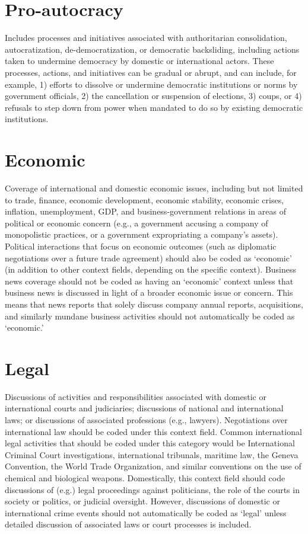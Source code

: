 \documentclass[11pt]{report}
\begin{document}
\section{Pro-autocracy}\label{context:pro-autocracy}

Includes processes and initiatives associated with authoritarian consolidation, autocratization, de-democratization, or democratic backsliding, including actions taken to undermine democracy by domestic or international actors. These processes, actions, and initiatives can be gradual or abrupt, and can include, for example, 1) efforts to dissolve or undermine democratic institutions or norms by government officials, 2) the cancellation or suspension of elections, 3) coups, or 4) refusals to step down from power when mandated to do so by existing democratic institutions.


\section{Economic}\label{context:economic}

Coverage of international and domestic economic issues, including but not limited to trade, finance, economic development, economic stability, economic crises, inflation, unemployment, GDP, and business-government relations in areas of political or economic concern (e.g., a government accusing a company of monopolistic practices, or a government expropriating a company's assets). Political interactions that focus on economic outcomes (such as diplomatic negotiations over a future trade agreement) should also be coded as `economic' (in addition to other context fields, depending on the specific context). Business news coverage should not be coded as having an `economic' context unless that business news is discussed in light of a broader economic issue or concern. This means that news reports that solely discuss company annual reports, acquisitions, and similarly mundane business activities should not automatically be coded as `economic.'


\section{Legal}\label{context:legal}

Discussions of activities and responsibilities associated with domestic or international courts and judiciaries; discussions of national and international laws; or discussions of associated professions (e.g., lawyers). Negotiations over international law should be coded under this context field. Common international legal activities that should be coded under this category would be International Criminal Court investigations, international tribunals, maritime law, the Geneva Convention, the World Trade Organization, and similar conventions on the use of chemical and biological weapons. Domestically, this context field should code discussions of (e.g.) legal proceedings against politicians, the role of the courts in society or politics, or judicial oversight. However, discussions of domestic or international crime events should not automatically be coded as `legal' unless detailed discussion of associated laws or court processes is included.
\end{document}
